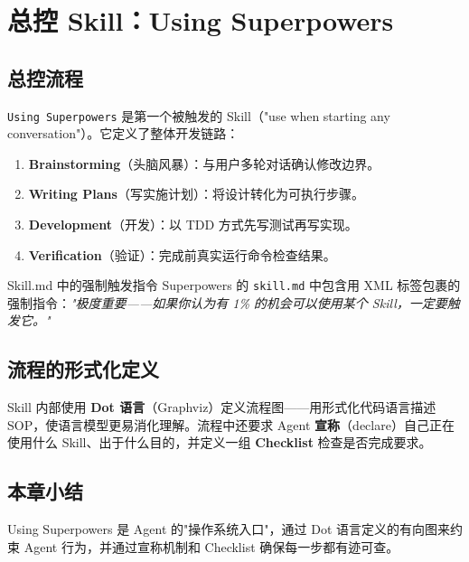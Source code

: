 \section{总控 Skill：Using Superpowers}

\subsection{总控流程}

\texttt{Using Superpowers} 是第一个被触发的 Skill（"use when starting any conversation"）。它定义了整体开发链路：

\begin{enumerate}
    \item \textbf{Brainstorming}（头脑风暴）：与用户多轮对话确认修改边界。
    \item \textbf{Writing Plans}（写实施计划）：将设计转化为可执行步骤。
    \item \textbf{Development}（开发）：以 TDD 方式先写测试再写实现。
    \item \textbf{Verification}（验证）：完成前真实运行命令检查结果。
\end{enumerate}

\begin{importantbox}{Skill.md 中的强制触发指令}
Superpowers 的 \texttt{skill.md} 中包含用 XML 标签包裹的强制指令：\textit{"极度重要——如果你认为有 1\% 的机会可以使用某个 Skill，一定要触发它。"}
\end{importantbox}

\subsection{流程的形式化定义}

Skill 内部使用 \textbf{Dot 语言}（Graphviz）定义流程图——用形式化代码语言描述 SOP，使语言模型更易消化理解。流程中还要求 Agent \textbf{宣称}（declare）自己正在使用什么 Skill、出于什么目的，并定义一组 \textbf{Checklist} 检查是否完成要求。

\subsection{本章小结}

Using Superpowers 是 Agent 的"操作系统入口"，通过 Dot 语言定义的有向图来约束 Agent 行为，并通过宣称机制和 Checklist 确保每一步都有迹可查。


